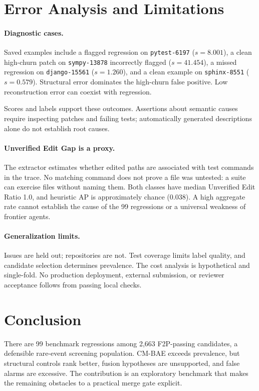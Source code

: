 \section{Error Analysis and Limitations}
\label{sec:error}
\paragraph{Diagnostic cases.}
Saved examples include a flagged regression on \texttt{pytest-6197} ($s=8.001$), a clean high-churn patch on \texttt{sympy-13878} incorrectly flagged ($s=41.454$), a missed regression on \texttt{django-15561} ($s=1.260$), and a clean example on \texttt{sphinx-8551} ($s=0.579$). Structural error dominates the high-churn false positive. Low reconstruction error can coexist with regression.

Scores and labels support these outcomes. Assertions about semantic causes require inspecting patches and failing tests; automatically generated descriptions alone do not establish root causes.

\paragraph{Unverified Edit Gap is a proxy.}
The extractor estimates whether edited paths are associated with test commands in the trace. No matching command does not prove a file was untested: a suite can exercise files without naming them. Both classes have median Unverified Edit Ratio 1.0, and heuristic AP is approximately chance (0.038). A high aggregate rate cannot establish the cause of the 99 regressions or a universal weakness of frontier agents.

\begin{minipage}{\columnwidth}
\paragraph{Generalization limits.}
Issues are held out; repositories are not. Test coverage limits label quality, and candidate selection determines prevalence. The cost analysis is hypothetical and single-fold. No production deployment, external submission, or reviewer acceptance follows from passing local checks.
\end{minipage}

\section{Conclusion}
There are 99 benchmark regressions among 2,663 F2P-passing candidates, a defensible rare-event screening population. CM-BAE exceeds prevalence, but structural controls rank better, fusion hypotheses are unsupported, and false alarms are excessive. The contribution is an exploratory benchmark that makes the remaining obstacles to a practical merge gate explicit.

